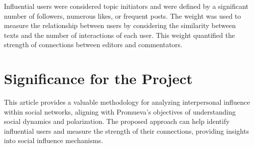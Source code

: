 \documentclass{article}
\begin{document}
Influential users were considered topic initiators and were defined by a significant number of followers, numerous likes, or frequent posts. The weight was used to measure the relationship between users by considering the similarity between texts and the number of interactions of each user. This weight quantified the strength of connections between editors and commentators.

\section*{Significance for the Project}
This article provides a valuable methodology for analyzing interpersonal influence within social networks, aligning with Promueva's objectives of understanding social dynamics and polarization. The proposed approach can help identify influential users and measure the strength of their connections, providing insights into social influence mechanisms.
\end{document}
